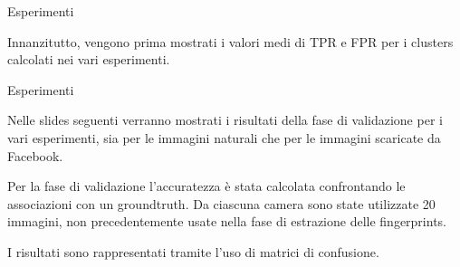 \begin{tframe}{Esperimenti}

Innanzitutto, vengono prima mostrati i valori medi di TPR e FPR per i clusters calcolati nei vari esperimenti.

\begin{table}[ht]
\centering %
\label{table:nonlin} %
\end{table}

\end{tframe}

\begin{tframe}{Esperimenti}

Nelle slides seguenti verranno mostrati i risultati della fase di validazione per i vari esperimenti, sia per le immagini naturali che per le immagini scaricate da Facebook.

\vspace{0.1in}

Per la fase di validazione l'accuratezza è stata calcolata confrontando le associazioni con un groundtruth. Da ciascuna camera sono state utilizzate 20 immagini, non precedentemente usate nella fase di estrazione delle fingerprints.

\vspace{0.1in}

I risultati sono rappresentati tramite l'uso di matrici di confusione.

\end{tframe}

